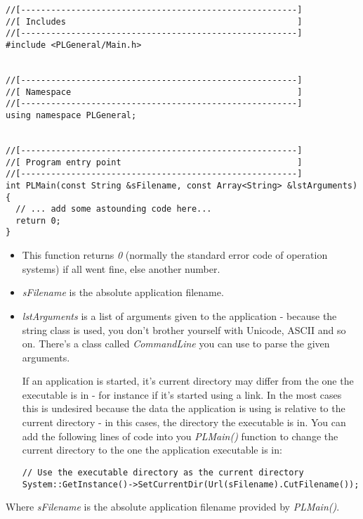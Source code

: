 \begin{lstlisting}[caption=Program entry point example]
//[-------------------------------------------------------]
//[ Includes                                              ]
//[-------------------------------------------------------]
#include <PLGeneral/Main.h>


//[-------------------------------------------------------]
//[ Namespace                                             ]
//[-------------------------------------------------------]
using namespace PLGeneral;


//[-------------------------------------------------------]
//[ Program entry point                                   ]
//[-------------------------------------------------------]
int PLMain(const String &sFilename, const Array<String> &lstArguments)
{
  // ... add some astounding code here...
  return 0;
}
\end{lstlisting}

\begin{itemize}
\item{This function returns \emph{0} (normally the standard error code of operation systems) if all went fine, else another number.}
\item{\emph{sFilename} is the absolute application filename.}
\item{\emph{lstArguments} is a list of arguments given to the application - because the string class is used, you don't brother yourself with Unicode, ASCII and so on. There's a class called \emph{CommandLine} you can use to parse the given arguments.}

If an application is started, it's current directory may differ from the one the executable is in - for instance if it's started using a link. In the most cases this is undesired because the data the application is using is relative to the current directory - in this cases, the directory the executable is in. You can add the following lines of code into you \emph{PLMain()} function to change the current directory to the one the application executable is in:

\begin{lstlisting}[caption=Set current directory example]
// Use the executable directory as the current directory
System::GetInstance()->SetCurrentDir(Url(sFilename).CutFilename());
\end{lstlisting}
\end{itemize}

Where \emph{sFilename} is the absolute application filename provided by \emph{PLMain()}.




